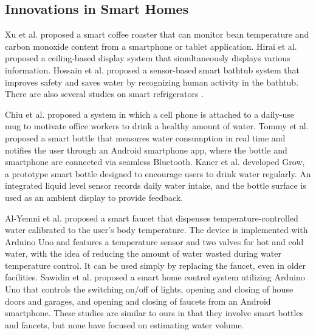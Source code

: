 \documentclass[sigconf,authordraft]{acmart}
\begin{document}
\subsection{Innovations in Smart Homes}
Xu et al.\cite{smart_home1} proposed a smart coffee roaster that can monitor bean temperature and carbon monoxide content from a smartphone or tablet application.
Hirai et al.\cite{smart_home2} proposed a ceiling-based display system that simultaneously displays various information.
Hossain et al.\cite{smart_home3} proposed a sensor-based smart bathtub system that improves safety and saves water by recognizing human activity in the bathtub.
There are also several studies on smart refrigerators \cite{smart_refrigerator1, smart_refrigerator2, smart_refrigerator3, smart_refrigerator4}. \par

Chiu et al.\cite{PlayfulBottle} proposed a system in which a cell phone is attached to a daily-use mug to motivate office workers to drink a healthy amount of water.
Tommy et al.\cite{SmartBottle} proposed a smart bottle that measures water consumption in real time and notifies the user through an Android smartphone app, where the bottle and smartphone are connected via seamless Bluetooth.
Kaner et al.\cite{GROW} developed Grow, a prototype smart bottle designed to encourage users to drink water regularly. An integrated liquid level sensor records daily water intake, and the bottle surface is used as an ambient display to provide feedback.\par

Al-Yemni et al.\cite{smart_faucet2} proposed a smart faucet that dispenses temperature-controlled water calibrated to the user’s body temperature. The device is implemented with Arduino Uno and features a temperature sensor and two valves for hot and cold water, with the idea of reducing the amount of water wasted during water temperature control. It can be used simply by replacing the faucet, even in older facilities.
Sawidin et al.\cite{smart_faucet3} proposed a smart home control system utilizing Arduino Uno that controls the switching on/off of lights, opening and closing of house doors and garages, and opening and closing of faucets from an Android smartphone.
These studies are similar to ours in that they involve smart bottles and faucets, but none have focused on estimating water volume.


\end{document}
